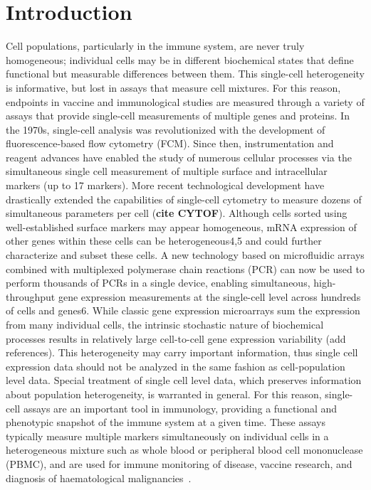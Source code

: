 \documentclass[11pt]{article}
\begin{document}
\section{Introduction}
Cell populations, particularly in the immune system, are never truly homogeneous; individual cells may be in different biochemical states that define functional but measurable differences between them. This single-cell heterogeneity is informative, but lost in assays that measure cell mixtures. For this reason, endpoints in vaccine and immunological studies are measured through a variety of assays that provide single-cell measurements of multiple genes and proteins. In the 1970s, single-cell analysis was revolutionized with the development of fluorescence-based flow cytometry (FCM). Since then, instrumentation and reagent advances have enabled the study of numerous cellular processes via the simultaneous single cell measurement of multiple surface and intracellular markers (up to 17 markers). More recent technological development have drastically extended the capabilities of single-cell cytometry to measure dozens of simultaneous parameters per cell (\textbf{cite CYTOF}). Although cells sorted using well-established surface markers may appear homogeneous, mRNA expression of other genes within these cells can be heterogeneous4,5 and could further characterize and subset these cells. A new technology based on microfluidic arrays combined with multiplexed polymerase chain reactions (PCR) can now be used to perform thousands of PCRs in a single device, enabling simultaneous, high-throughput gene expression measurements at the single-cell level across hundreds of cells and genes6. While classic gene expression microarrays sum the expression from many individual cells, the intrinsic stochastic nature of biochemical processes results in relatively large cell-to-cell gene expression variability (add references). This heterogeneity may carry important information, thus single cell expression data should not be analyzed in the same fashion as cell-population level data. Special treatment of single cell level data, which preserves information about population heterogeneity, is warranted in general. For this reason, single-cell assays are an important tool in immunology, providing a functional and phenotypic snapshot of the immune system at a given time. These assays typically measure multiple markers simultaneously on individual cells in a heterogeneous mixture such as whole blood or peripheral blood cell mononuclease (PBMC), and are used for immune monitoring of disease, vaccine research, and diagnosis of haematological malignancies~\cite{Altman:1996wf,Betts:2006dw,Inokuma:2007tn}.
\end{document}

